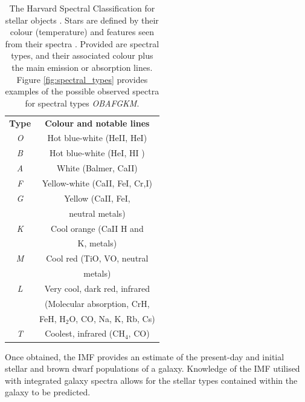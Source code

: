 \documentclass[12pt, twocolumn, nofootinbib]{revtex4-1}    %
\begin{document}
\begin{table}
\begin{center}
\begin{tabular}{c@{\hskip 20pt}c} 
 \hline
 \textbf{Type} & \textbf{Colour and notable lines} \\ [0.5ex] 
 \textit{O} & Hot blue-white (HeII, HeI) \\
 \textit{B} & Hot blue-white (HeI, HI ) \\
 \textit{A} & White (Balmer, CaII) \\
 \textit{F} & Yellow-white (CaII, FeI, Cr,I) \\
 \textit{G} & Yellow (CaII, FeI,  \\
  & neutral metals) \\
 \textit{K} & Cool orange (CaII H and \\ 
  & K, metals) \\
 \textit{M} & Cool red (TiO, VO, neutral \\
  & metals) \\
 \textit{L} & Very cool, dark red, infrared \\
  & (Molecular absorption, CrH, \\
  & FeH, H$_2$O, CO, Na, K, Rb, Cs) \\
 \textit{T} & Coolest, infrared (CH$_4$, CO) \\
 \hline
\end{tabular}
\caption{The Harvard Spectral Classification for stellar objects \citep{1916AnHar..76...19C}. Stars are defined by their colour (temperature) and features seen from their spectra \citep{stellar_colour, 1925PhDT.........1P}. Provided are spectral types, and their associated colour plus the main emission or absorption lines. Figure \ref{fig:spectral_types} provides examples of the possible observed spectra for spectral types \textit{OBAFGKM}.}
\label{table:spectral_classification}
\end{center}
\end{table}

Once obtained, the IMF provides an estimate of the present-day and initial stellar and brown dwarf populations of a galaxy. Knowledge of the IMF utilised with integrated galaxy spectra allows for the stellar types contained within the galaxy to be predicted.
\end{document}
